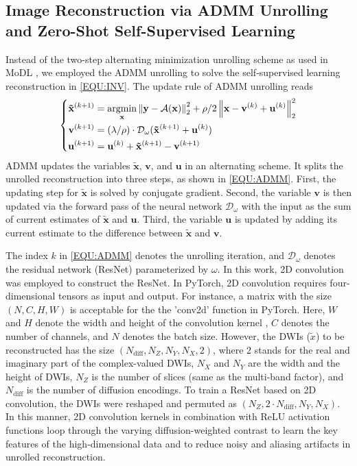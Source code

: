 \documentclass[journal,twoside,web]{ieeecolor}
\newcommand{\argmin}{\operatornamewithlimits{argmin}}
\newcommand{\norm}[1]{\left\lVert#1\right\rVert}
\begin{document}
    \subsection{Image Reconstruction via ADMM Unrolling and Zero-Shot Self-Supervised Learning}

    Instead of the two-step alternating minimization unrolling scheme as used in MoDL
    \cite{aggarwal_2018_modl},
    we employed the ADMM unrolling
    to solve the self-supervised learning reconstruction
    in \cref{EQU:INV}. The update rule of ADMM unrolling reads
	\begin{equation} \label{EQU:ADMM}
		\left\{\begin{aligned}
			\mathbf{\tilde{x}}^{(k+1)} &= \argmin_{\mathbf{x}} \norm{\mathbf{y} - \mathcal{A}(\mathbf{x})}_2^2 + \rho/2 \norm{ \mathbf{x} - \mathbf{v}^{(k)} + \mathbf{u}^{(k)}}_2^2 \\
			\mathbf{v}^{(k+1)} &= (\lambda/\rho) \cdot \mathcal{D}_{\omega} (\mathbf{\tilde{x}}^{(k+1)} + \mathbf{u}^{(k)}) \\
			\mathbf{u}^{(k+1)} &= \mathbf{u}^{(k)} + \mathbf{\tilde{x}}^{(k+1)} - \mathbf{v}^{(k+1)}
		\end{aligned}\right.
	\end{equation}
    ADMM updates the variables $\mathbf{\tilde{x}}$, $\mathbf{v}$,
    and $\mathbf{u}$ in an alternating scheme.
    It splits the unrolled reconstruction into three steps,
    as shown in \cref{EQU:ADMM}.
    First, the updating step for $\mathbf{\tilde{x}}$ is solved by conjugate gradient.
    Second, the variable $\mathbf{v}$ is then updated
    via the forward pass of the neural network $\mathcal{D}_{\omega}$
    with the input as the sum of current estimates
    of $\mathbf{\tilde{x}}$ and $\mathbf{u}$.
    Third, the variable $\mathbf{u}$ is updated
    by adding its current estimate to the difference
    between $\mathbf{\tilde{x}}$ and $\mathbf{v}$.

    The index $k$ in \cref{EQU:ADMM} denotes the unrolling iteration,
    and $\mathcal{D}_{\omega}$ denotes the residual network (ResNet) \cite{he_2016_resnet}
    parameterized by $\omega$.
	In this work, 2D convolution was employed to construct the ResNet.
	In PyTorch, 2D convolution requires four-dimensional tensors as input and output.
	For instance, a matrix with the size $(N, C, H, W)$ is acceptable
	for the the 'conv2d' function in PyTorch.
	Here, $W$ and $H$ denote the width and height of the convolution kernel ,
	$C$ denotes the number of channels, and $N$ denotes the batch size.
	However, the DWIs ($\tilde{x}$) to be reconstructed
	has the size $(N_{\text{diff}}, N_Z, N_Y, N_X, 2)$,
	where $2$ stands for the real and imaginary part of the complex-valued DWIs,
	$N_X$ and $N_Y$ are the width and the height of DWIs,
	$N_Z$ is the number of slices (same as the multi-band factor), and
	$N_{\text{diff}}$ is the number of diffusion encodings.
	To train a ResNet based on 2D convolution, the DWIs were reshaped and permuted
	as $(N_Z, 2 \cdot N_{\text{diff}}, N_Y, N_X)$.
	In this manner, 2D convolution kernels in combination with ReLU activation functions
	loop through the varying diffusion-weighted contrast
	to learn the key features of the high-dimensional data and
	to reduce noisy and aliasing artifacts in unrolled reconstruction.
\end{document}
